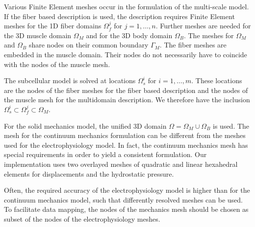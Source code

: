 Various Finite Element meshes occur in the formulation of the multi-scale model.
If the fiber based description is used, the description requires Finite Element meshes for the 1D fiber domains $\Omega_f^j$ for ${j=1,\dots,n}$. Further meshes are needed for the 3D muscle domain $\Omega_M$ and for the 3D body domain $\Omega_B$. The meshes for $\Omega_M$ and $\Omega_B$ share nodes on their common boundary $\Gamma_M$. The fiber meshes are embedded in the muscle domain. Their nodes do not necessarily have to coincide with the nodes of the muscle mesh.

The subcellular model is solved at locations $\Omega_s^i$ for $i=1,\dots,m$. These locations are the nodes of the fiber meshes for the fiber based description and the nodes of the muscle mesh for the multidomain description. We therefore have the inclusion $\Omega_s^i \subset \Omega_f^j \subset \Omega_M$.

For the solid mechanics model, the unified 3D domain $\Omega = \Omega_M \cup \Omega_B$ is used. The mesh for the continuum mechanics formulation can be different from the meshes used for the electrophysiology model. In fact, the continuum mechanics mesh has special requirements in order to yield a consistent formulation. Our implementation uses two overlayed meshes of quadratic and linear hexahedral elements for displacements and the hydrostatic pressure. 

Often, the required accuracy of the electrophysiology model is higher than for the continuum mechanics model, such that differently resolved meshes can be used. To facilitate data mapping, the nodes of the mechanics mesh should be chosen as subset of the nodes of the electrophysiology meshes.


